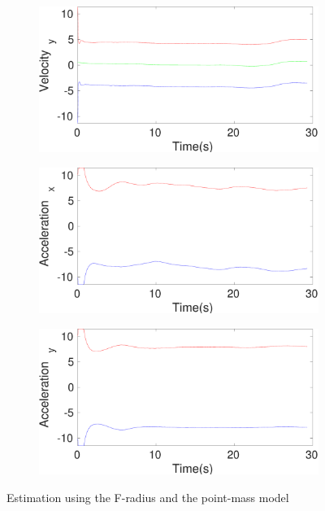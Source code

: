 \begin{figure}[h]
\begin{subfigure}{.5\linewidth}
\end{subfigure}
\begin{subfigure}{.5\linewidth}
\centering
\includegraphics[width=\linewidth]{figures/Frad/s3pmSMVelocity_y}
\end{subfigure}
\begin{subfigure}{.5\linewidth}
\centering
\includegraphics[width=\linewidth]{figures/Frad/s3pmSMAcceleration_x}
\end{subfigure}
\begin{subfigure}{.5\linewidth}
\centering
\includegraphics[width=\linewidth]{figures/Frad/s3pmSMAcceleration_y}
\end{subfigure}
\caption{Estimation using the F-radius and the point-mass model}
\end{figure}

